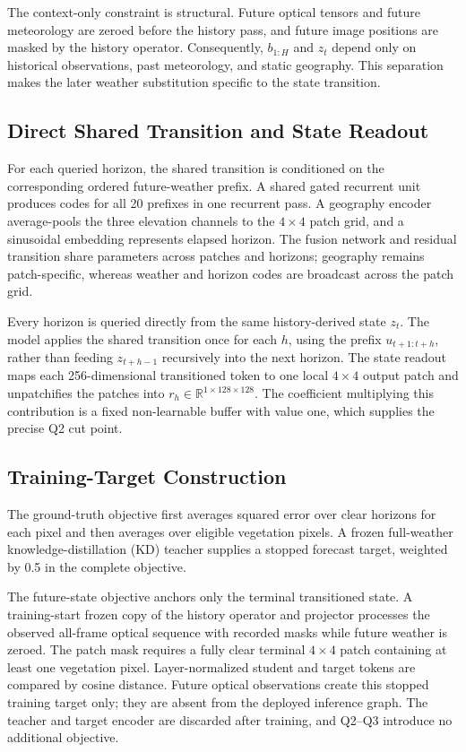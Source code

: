 \documentclass[letterpaper]{article}
\begin{document}
The context-only constraint is structural. Future optical tensors and future
meteorology are zeroed before the history pass, and future image positions are
masked by the history operator. Consequently, \(b_{1:H}\) and \(z_t\) depend
only on historical observations, past meteorology, and static geography. This
separation makes the later weather substitution specific to the state
transition.

\subsection{Direct Shared Transition and State Readout}

For each queried horizon, the shared transition is conditioned on the
corresponding ordered future-weather prefix. A shared gated recurrent unit
produces codes for all 20 prefixes in one recurrent pass. A geography encoder
average-pools the three elevation channels to the \(4\times4\) patch grid, and
a sinusoidal embedding represents elapsed horizon. The fusion network and
residual transition share parameters across patches and horizons; geography
remains patch-specific, whereas weather and horizon codes are broadcast
across the patch grid.

Every horizon is queried directly from the same history-derived state
\(z_t\). The model applies the shared transition once for each \(h\), using
the prefix \(u_{t+1:t+h}\), rather than feeding \(z_{t+h-1}\) recursively into
the next horizon. The state readout maps each 256-dimensional transitioned token
to one local \(4\times4\) output patch and unpatchifies the patches into
\(r_h\in\mathbb R^{1\times128\times128}\). The coefficient multiplying this
contribution is a fixed non-learnable buffer with value one, which supplies
the precise Q2 cut point.

\subsection{Training-Target Construction}

The ground-truth objective first averages squared error over clear horizons
for each pixel and then averages over eligible vegetation pixels. A frozen
full-weather knowledge-distillation (KD) teacher supplies a stopped forecast
target, weighted by 0.5 in the complete objective.

The future-state objective anchors only the terminal transitioned state. A
training-start frozen copy of the history operator and projector processes the
observed all-frame optical sequence with recorded masks while future weather
is zeroed. The patch mask requires a fully clear terminal \(4\times4\) patch
containing at least one vegetation pixel. Layer-normalized student and target
tokens are compared by cosine distance. Future optical observations create
this stopped training target only; they are absent from the deployed
inference graph. The teacher and target encoder are discarded after training,
and Q2--Q3 introduce no additional objective.
\end{document}
